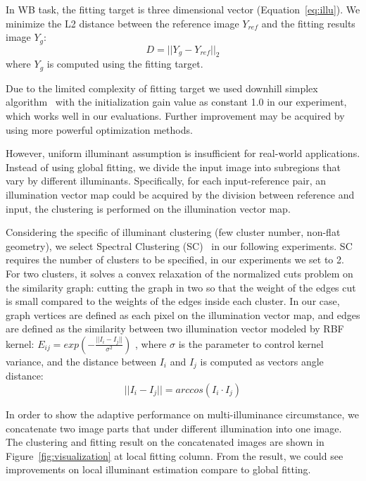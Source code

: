 \documentclass[10pt,twocolumn,letterpaper]{article}
\begin{document}
In WB task, the fitting target is three dimensional vector (Equation~\ref{eq:illu}).
We minimize the L2 distance between the reference image $Y_{ref}$ and the fitting results image $Y_g$:
\begin{equation}
D = ||Y_g-Y_{ref}||_2
\label{eq:fitting}
\end{equation}
where $Y_g$ is computed using the fitting target.

Due to the limited complexity of fitting target
we used downhill simplex algorithm~\cite{nelder1965simplex} with the initialization gain value as constant 1.0 in our experiment,
which works well in our evaluations.
Further improvement may be acquired by using more powerful optimization methods.

However, uniform illuminant assumption is insufficient for real-world applications.
Instead of using global fitting, we divide the input image into subregions that vary by different illuminants.
Specifically, for each input-reference pair, an illumination vector map could be acquired by the division between reference and input,
the clustering is performed on the illumination vector map.

Considering the specific of illuminant clustering (few cluster number, non-flat geometry),
we select Spectral Clustering (SC)~\cite{stella2003multiclass} in our following experiments.
SC requires the number of clusters to be specified,
in our experiments we set to 2.
For two clusters, it solves a convex relaxation of the normalized cuts problem on the similarity graph:
cutting the graph in two so that the weight of the edges cut is small compared to the weights of the edges inside each cluster.
In our case, graph vertices are defined as each pixel on the illumination vector map,
and edges are defined as the similarity between two illumination vector modeled by  RBF kernel:
$
E_{ij}=exp(-\frac{||I_i - I_j||}{\sigma^2})
$
, where $\sigma$ is the parameter to control kernel variance, and the distance between $I_i$ and $I_j$ is computed as vectors angle distance:
\begin{equation}
||I_i - I_j|| = arccos(I_i \cdot I_j)
\label{eq:acos}
\end{equation}

In order to show the adaptive performance on multi-illuminance circumstance,
we concatenate two image parts that under different illumination into one image.
The clustering and fitting result on the concatenated images are shown in Figure~\ref{fig:visualization} at local fitting column.
From the result, we could see improvements on local illuminant estimation compare to global fitting.
\end{document}
